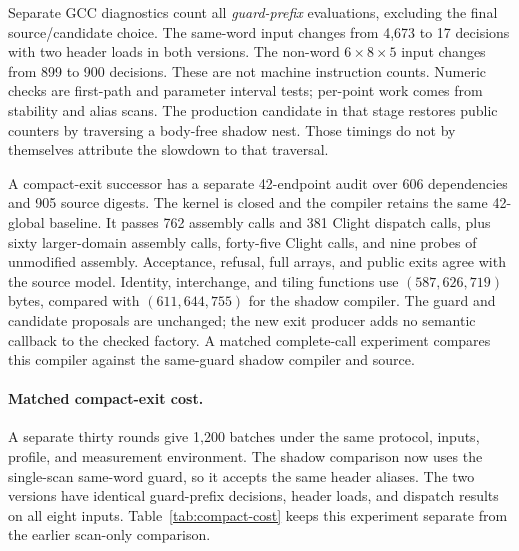 Separate GCC diagnostics count all \emph{guard-prefix}  evaluations,
excluding the final source/candidate choice. The same-word input changes from
4,673 to 17 decisions with two header loads in both versions. The non-word
$6\times8\times5$ input changes from 899 to 900 decisions. These are not machine
instruction counts. Numeric checks are first-path and parameter interval tests;
per-point work comes from stability and alias scans. The production candidate
in that stage restores public counters by traversing a body-free shadow nest.
Those timings do not by themselves attribute the slowdown to that traversal.

A compact-exit successor has a separate 42-endpoint audit over 606 dependencies
and 905 source digests. The kernel is closed and the compiler retains the same
42-global baseline. It passes 762 assembly calls and 381 Clight dispatch calls,
plus sixty larger-domain assembly calls, forty-five Clight calls, and nine
probes of unmodified assembly. Acceptance, refusal, full arrays, and public
exits agree with the source model. Identity, interchange, and tiling functions
use $(587,626,719)$ bytes, compared with $(611,644,755)$ for the shadow compiler.
The guard and candidate proposals are unchanged; the new exit producer adds
no semantic callback to the checked factory. A matched complete-call experiment
compares this compiler against the same-guard shadow compiler and source.

\paragraph{Matched compact-exit cost.}
A separate thirty rounds give 1,200 batches under the same protocol, inputs,
profile, and measurement environment. The shadow comparison now uses the
single-scan same-word guard, so it accepts the same header aliases. The two
versions have identical guard-prefix decisions, header loads, and dispatch
results on all eight inputs. Table~\ref{tab:compact-cost} keeps this experiment
separate from the earlier scan-only comparison.

